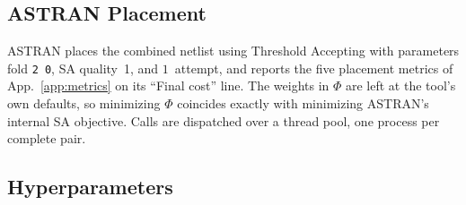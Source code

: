 \documentclass[letterpaper]{article}
\theoremstyle{plain}
\theoremstyle{definition}
\begin{document}
\subsection{ASTRAN Placement}

ASTRAN places the combined netlist using Threshold Accepting with parameters
fold \texttt{2 0}, SA quality~1, and $1$~attempt, and reports the five
placement metrics of App.~\ref{app:metrics} on its ``Final cost'' line.
The weights in $\Phi$ are left at the tool's own defaults, so minimizing
$\Phi$ coincides exactly with minimizing ASTRAN's internal SA objective.
Calls are dispatched over a thread pool, one process per complete pair.

\subsection{Hyperparameters}
\end{document}
